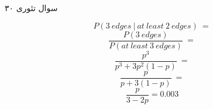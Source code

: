 سوال تئوری ۳۰

$$P(3 \ edges \ | \ at \ least \ 2 \ edges) \ =$$
$$\frac{P(3 \ edges)}{P(at \ least \ 3 \ edges)} \ =$$
$$\frac{p^3}{p^3+3p^2(1-p)} \ =$$
$$\frac{p}{p+3(1-p)} \ =$$
$$\frac{p}{3-2p} = 0.003$$